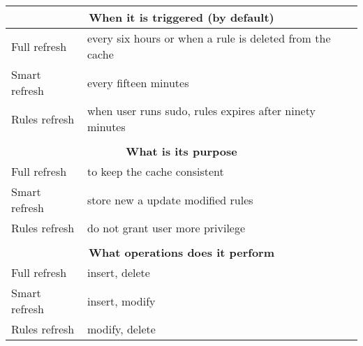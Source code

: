\begin{tabular}{l l}
\multicolumn{2}{c}{\textbf{When it is triggered (by default)}} \\
\hline\hline
Full refresh & every six hours or when a rule is deleted from the cache \\
\hline
Smart refresh & every fifteen minutes \\
\hline
Rules refresh & when user runs sudo, rules expires after ninety minutes \\
\hline
\multicolumn{2}{c}{} \\
\multicolumn{2}{c}{\textbf{What is its purpose}} \\
\hline\hline
Full refresh & to keep the cache consistent \\
\hline
Smart refresh & store new a update modified rules \\
\hline
Rules refresh & do not grant user more privilege \\
\hline
\multicolumn{2}{c}{} \\
\multicolumn{2}{c}{\textbf{What operations does it perform}} \\
\hline\hline
Full refresh & insert, delete \\
\hline
Smart refresh & insert, modify \\
\hline
Rules refresh & modify, delete \\
\hline
\end{tabular}
